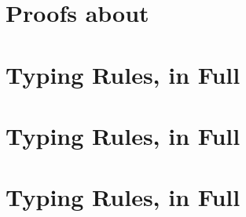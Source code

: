 
\chapter{Proofs about \sedel}
\label{appendix:proofs}



\chapter{\namee Typing Rules, in Full}
\label{appendix:lambdai}



\chapter{\fnamee Typing Rules, in Full}
\label{appendix:fi}


\chapter{\sedel Typing Rules, in Full}
\label{appendix:sedel}

